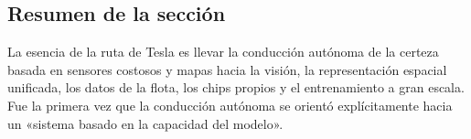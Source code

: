 \subsection{Resumen de la sección}

La esencia de la ruta de Tesla es llevar la conducción autónoma de la certeza basada en sensores costosos y mapas hacia la visión, la representación espacial unificada, los datos de la flota, los chips propios y el entrenamiento a gran escala. Fue la primera vez que la conducción autónoma se orientó explícitamente hacia un «sistema basado en la capacidad del modelo».
